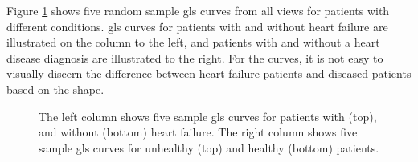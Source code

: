 \clearpage

Figure \ref{fig:gls_curves_vs_hf_and_ind} shows five random sample \acrshort{gls} curves from all views for patients with different conditions. \acrshort{gls} curves for patients with and without heart failure are illustrated on the column to the left, and patients with and without a heart disease diagnosis are illustrated to the right. For the curves, it is not easy to visually discern the difference between heart failure patients and diseased patients based on the shape.

\begin{figure}
    \centering
    
    \caption{The left column shows five sample \acrshort{gls} curves for patients with (top), and without (bottom) heart failure. The right column shows five sample \acrshort{gls} curves for unhealthy (top) and healthy (bottom) patients.}
    \label{fig:gls_curves_vs_hf_and_ind}
\end{figure}

\clearpage

